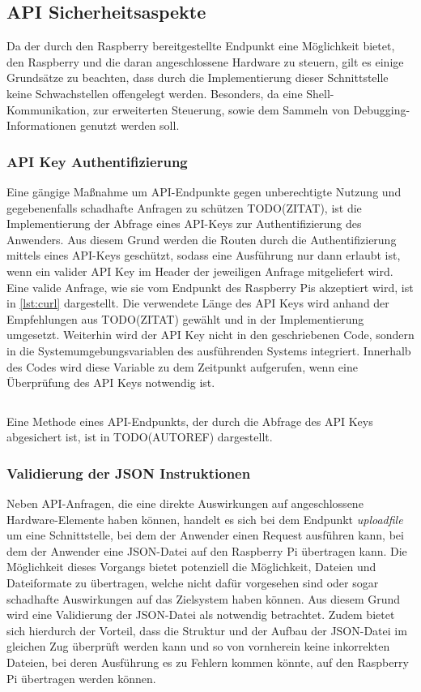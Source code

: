 \subsection{API Sicherheitsaspekte}
Da der durch den Raspberry bereitgestellte Endpunkt eine Möglichkeit bietet, den Raspberry und die daran angeschlossene Hardware zu steuern, gilt es einige Grundsätze zu beachten, dass durch die Implementierung dieser Schnittstelle keine Schwachstellen offengelegt werden. Besonders, da eine Shell-Kommunikation, zur erweiterten Steuerung, sowie dem Sammeln von Debugging-Informationen genutzt werden soll.

\subsubsection*{API Key Authentifizierung}
Eine gängige Maßnahme um API-Endpunkte gegen unberechtigte Nutzung und gegebenenfalls schadhafte Anfragen zu schützen TODO(ZITAT), ist die Implementierung der Abfrage eines API-Keys zur Authentifizierung des Anwenders. Aus diesem Grund werden die Routen durch die Authentifizierung mittels eines API-Keys geschützt, sodass eine Ausführung nur dann erlaubt ist, wenn ein valider API Key im Header der jeweiligen Anfrage mitgeliefert wird. Eine valide Anfrage, wie sie vom Endpunkt des Raspberry Pis akzeptiert wird, ist in \autoref{lst:curl} dargestellt. Die verwendete Länge des API Keys wird anhand der Empfehlungen aus TODO(ZITAT) gewählt und in der Implementierung umgesetzt. Weiterhin wird der API Key nicht in den geschriebenen Code, sondern in die Systemumgebungsvariablen des ausführenden Systems integriert. Innerhalb des Codes wird diese Variable zu dem Zeitpunkt aufgerufen, wenn eine Überprüfung des API Keys notwendig ist.

\inputminted{text}{{assets/code/curl.sh}}
\vspace*{-3mm}
\vspace*{3mm}

Eine Methode eines API-Endpunkts, der durch die Abfrage des API Keys abgesichert ist, ist in TODO(AUTOREF) dargestellt.

\subsubsection*{Validierung der JSON Instruktionen}
Neben API-Anfragen, die eine direkte Auswirkungen auf angeschlossene Hardware-Elemente haben können, handelt es sich bei dem Endpunkt \textit{uploadfile} um eine Schnittstelle, bei dem der Anwender einen Request ausführen kann, bei dem der Anwender eine JSON-Datei auf den Raspberry Pi übertragen kann. Die Möglichkeit dieses Vorgangs bietet potenziell die Möglichkeit, Dateien und Dateiformate zu übertragen, welche nicht dafür vorgesehen sind oder sogar schadhafte Auswirkungen auf das Zielsystem haben können. Aus diesem Grund wird eine Validierung der JSON-Datei als notwendig betrachtet. Zudem bietet sich hierdurch der Vorteil, dass die Struktur und der Aufbau der JSON-Datei im gleichen Zug überprüft werden kann und so von vornherein keine inkorrekten Dateien, bei deren Ausführung es zu Fehlern kommen könnte, auf den Raspberry Pi übertragen werden können.

